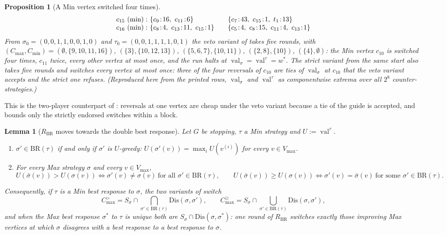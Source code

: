 \documentclass[11pt]{article}
\theoremstyle{plain}
\newtheorem{lemma}[theorem]{Lemma}
\newtheorem{proposition}[theorem]{Proposition}
\theoremstyle{definition}
\DeclareMathOperator{\val}{val}
\newcommand{\Vmax}{V_{\max}}
\begin{document}
\begin{proposition}[A Min vertex switched four times]
\[\begin{array}{r@{\ }l@{\qquad}l}
  c_{15}\ (\min): & \{c_{9}\!:\!16,\ c_{11}\!:\!6\} & \{c_{7}\!:\!43,\ c_{15}\!:\!1,\ t_1\!:\!13\}\\
  c_{16}\ (\min): & \{c_{8}\!:\!4,\ c_{13}\!:\!11,\ c_{15}\!:\!1\} & \{c_{5}\!:\!4,\ c_{8}\!:\!15,\ c_{11}\!:\!4,\ c_{13}\!:\!1\}
\end{array}
\]
From $\sigma_0=(0,0,1,1,0,0,1,0)$ and $\tau_0=(0,0,1,1,1,1,0,1)$ the veto
variant of  takes five rounds, with
$(C_{\max},C_{\min})=(\emptyset,\{9,10,11,16\})$, $(\{3\},\{10,12,13\})$,
$(\{5,6,7\},\{10,11\})$, $(\{2,8\},\{10\})$, $(\{4\},\emptyset)$: the Min
vertex $c_{10}$ is switched four times, $c_{11}$ twice, every other vertex
at most once, and the run halts
at $\val_\sigma=\val^{\tau}=w^{\ast}$. The strict variant from the same
start also takes five rounds and switches every vertex at most once: three
of the four reversals of $c_{10}$ are ties of $\val_\sigma$ at $c_{10}$
that the veto variant accepts and the strict one refuses. (Reproduced here
from the printed rows, $\val_\sigma$ and $\val^{\tau}$ as componentwise
extrema over all $2^{8}$ counter-strategies.)
\end{proposition}

This is the two-player counterpart of : reversals at
one vertex are cheap under the veto variant because a tie of the guide is
accepted, and  bounds only the strictly endorsed
switches within a block.


\begin{lemma}[$R_{\mathrm{BR}}$ moves towards the double best response]\label{lem:double-br}
Let $G$ be stopping, $\tau$ a Min strategy and $U:=\val^{\tau}$.
\begin{enumerate}
\item[(a)] $\sigma'\in\mathrm{BR}(\tau)$ if and only if $\sigma'$ is
  \emph{$U$-greedy}: $U(\sigma'(v))=\max_iU(v^{(i)})$ for every $v\in\Vmax$.
\item[(b)] For every Max strategy $\sigma$ and every $v\in\Vmax$,
\[
  U(\bar\sigma(v))>U(\sigma(v))\iff \sigma'(v)\ne\sigma(v)\ \text{for all }
  \sigma'\in\mathrm{BR}(\tau),\qquad
  U(\bar\sigma(v))\ge U(\sigma(v))\iff \sigma'(v)=\bar\sigma(v)\ \text{for some }
  \sigma'\in\mathrm{BR}(\tau).
\]
\end{enumerate}
Consequently, if $\tau$ is a Min best response to $\sigma$, the two variants of
 switch
\[
  C^{>}_{\max}=S_\sigma\cap\!\!\bigcap_{\sigma'\in\mathrm{BR}(\tau)}\!\!\mathrm{Dis}(\sigma,\sigma'),
  \qquad
  C^{\ge}_{\max}=S_\sigma\cap\!\!\bigcup_{\sigma'\in\mathrm{BR}(\tau)}\!\!\mathrm{Dis}(\sigma,\sigma'),
\]
and when the Max best response $\sigma^{\ast}$ to $\tau$ is unique both are
$S_\sigma\cap\mathrm{Dis}(\sigma,\sigma^{\ast})$: one round of $R_{\mathrm{BR}}$
switches exactly those improving Max vertices at which $\sigma$ disagrees with
a best response to a best response to $\sigma$.
\end{lemma}
\end{document}
